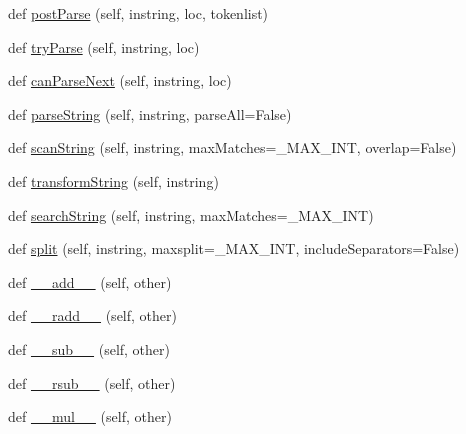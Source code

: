 \begin{DoxyCompactItemize}
def \hyperlink{classsetuptools_1_1__vendor_1_1pyparsing_1_1ParserElement_aa26027e65ffde65f6e6dedcc9dadac2d}{post\+Parse} (self, instring, loc, tokenlist)
\item 
def \hyperlink{classsetuptools_1_1__vendor_1_1pyparsing_1_1ParserElement_a51e2e6e778178f5c669fb4ad6b1b8ded}{try\+Parse} (self, instring, loc)
\item 
def \hyperlink{classsetuptools_1_1__vendor_1_1pyparsing_1_1ParserElement_ac88b6fc413a55ded2a2bc2c37c31561c}{can\+Parse\+Next} (self, instring, loc)
\item 
def \hyperlink{classsetuptools_1_1__vendor_1_1pyparsing_1_1ParserElement_aadaa0a9ab4b6dd77f5363812a6d8f314}{parse\+String} (self, instring, parse\+All=False)
\item 
def \hyperlink{classsetuptools_1_1__vendor_1_1pyparsing_1_1ParserElement_a119bfc59496f168ee6d19cf781d83103}{scan\+String} (self, instring, max\+Matches=\+\_\+\+M\+A\+X\+\_\+\+I\+NT, overlap=False)
\item 
def \hyperlink{classsetuptools_1_1__vendor_1_1pyparsing_1_1ParserElement_af25c27f581e141385fae3884f19274e8}{transform\+String} (self, instring)
\item 
def \hyperlink{classsetuptools_1_1__vendor_1_1pyparsing_1_1ParserElement_a18ea0f1af4a045470230de54047b0ba5}{search\+String} (self, instring, max\+Matches=\+\_\+\+M\+A\+X\+\_\+\+I\+NT)
\item 
def \hyperlink{classsetuptools_1_1__vendor_1_1pyparsing_1_1ParserElement_a261b8172db2d9632b1945ecd174bd3eb}{split} (self, instring, maxsplit=\+\_\+\+M\+A\+X\+\_\+\+I\+NT, include\+Separators=False)
\item 
def \hyperlink{classsetuptools_1_1__vendor_1_1pyparsing_1_1ParserElement_ad846d0bf79031f29ae3e9aa6274db70c}{\+\_\+\+\_\+add\+\_\+\+\_\+} (self, other)
\item 
def \hyperlink{classsetuptools_1_1__vendor_1_1pyparsing_1_1ParserElement_abee68ac65a25d3a6d4e0fba4cdc8602c}{\+\_\+\+\_\+radd\+\_\+\+\_\+} (self, other)
\item 
def \hyperlink{classsetuptools_1_1__vendor_1_1pyparsing_1_1ParserElement_a1a9701f4c9c8821bdb02e36f6a758d9a}{\+\_\+\+\_\+sub\+\_\+\+\_\+} (self, other)
\item 
def \hyperlink{classsetuptools_1_1__vendor_1_1pyparsing_1_1ParserElement_af0cbc4d86d2801e2ef4129a35a5c0f45}{\+\_\+\+\_\+rsub\+\_\+\+\_\+} (self, other)
\item 
def \hyperlink{classsetuptools_1_1__vendor_1_1pyparsing_1_1ParserElement_a278594ef9793f203993934936f3cfed7}{\+\_\+\+\_\+mul\+\_\+\+\_\+} (self, other)

\end{DoxyCompactItemize}
